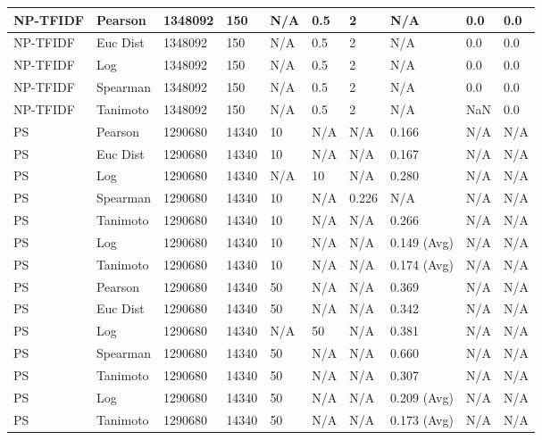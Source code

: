 \documentclass{article}
\begin{document}
\begin{longtable}{ |p{1.7cm}|p{1.9cm}|p{1.5cm}|p{1.5cm}|p{0.75cm}|p{0.75cm}|p{0.75cm}|p{0.75cm}|p{1.5cm}|p{1.5cm}|}
    NP-TFIDF  & Pearson & 1348092 & 150 & N/A & 0.5 & 2 & N/A & 0.0 & 0.0  \\ \hline
    NP-TFIDF  & Euc Dist & 1348092 & 150 & N/A & 0.5 & 2 & N/A &0.0 & 0.0   \\ \hline
    NP-TFIDF  & Log & 1348092 & 150 & N/A & 0.5 & 2 & N/A & 0.0 & 0.0  \\ \hline
    NP-TFIDF  & Spearman & 1348092 & 150 & N/A & 0.5 & 2 & N/A &0.0 & 0.0 \\ \hline
    NP-TFIDF  & Tanimoto & 1348092 & 150 & N/A & 0.5 & 2 & N/A & NaN & 0.0 \\ \hline
    
    PS & Pearson & 1290680 & 14340 & 10 & N/A & N/A & 0.166 & N/A & N/A  \\ \hline
    PS  & Euc Dist & 1290680 & 14340 & 10 & N/A & N/A & 0.167 & N/A & N/A   \\ \hline
    PS & Log & 1290680 & 14340 & N/A &  10 & N/A& 0.280 & N/A & N/A  \\ \hline
    PS & Spearman & 1290680 & 14340 & 10 & N/A & 0.226 & N/A & N/A & N/A \\ \hline
    PS & Tanimoto & 1290680 & 14340 & 10 & N/A& N/A & 0.266 & N/A & N/A \\ \hline
    PS & Log & 1290680 & 14340 & 10 & N/A& N/A & 0.149 (Avg) & N/A & N/A \\ \hline
    PS & Tanimoto & 1290680 & 14340 & 10 & N/A & N/A & 0.174 (Avg) & N/A & N/A \\ \hline
    
    PS & Pearson & 1290680 & 14340 & 50 & N/A & N/A & 0.369 & N/A & N/A  \\ \hline
    PS & Euc Dist & 1290680 & 14340 & 50 & N/A & N/A & 0.342 & N/A & N/A   \\ \hline
    PS & Log & 1290680 & 14340 & N/A &  50 & N/A& 0.381 & N/A & N/A  \\ \hline
    PS & Spearman & 1290680 & 14340 & 50 & N/A & N/A & 0.660 & N/A & N/A \\ \hline
    PS & Tanimoto & 1290680 & 14340 & 50 & N/A& N/A & 0.307 & N/A & N/A \\ \hline
    PS  & Log & 1290680 & 14340 & 50 & N/A& N/A & 0.209 (Avg) & N/A & N/A \\ \hline
    PS & Tanimoto & 1290680 & 14340 & 50 & N/A & N/A & 0.173 (Avg) & N/A & N/A \\ \hline
    

\end{longtable}
\end{document}
